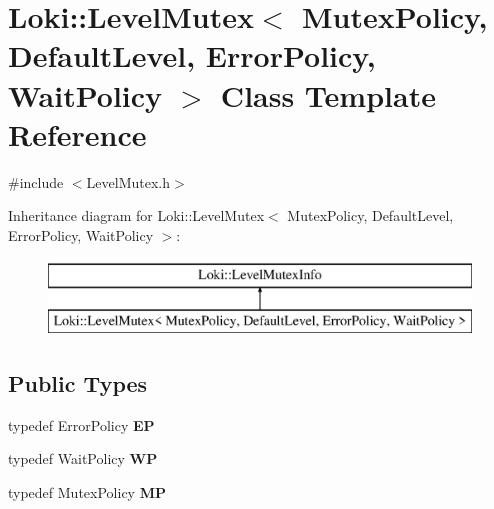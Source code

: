 \hypertarget{classLoki_1_1LevelMutex}{}\section{Loki\+:\+:Level\+Mutex$<$ Mutex\+Policy, Default\+Level, Error\+Policy, Wait\+Policy $>$ Class Template Reference}
\label{classLoki_1_1LevelMutex}


{\ttfamily \#include $<$Level\+Mutex.\+h$>$}

Inheritance diagram for Loki\+:\+:Level\+Mutex$<$ Mutex\+Policy, Default\+Level, Error\+Policy, Wait\+Policy $>$\+:\begin{figure}[H]
\begin{center}
\leavevmode
\includegraphics[height=2.000000cm]{classLoki_1_1LevelMutex}
\end{center}
\end{figure}
\subsection*{Public Types}
\begin{DoxyCompactItemize}
\item 
\hypertarget{classLoki_1_1LevelMutex_a4fdd142b6c6bd6a41d40d0b36e3973fa}{}typedef Error\+Policy {\bfseries E\+P}\label{classLoki_1_1LevelMutex_a4fdd142b6c6bd6a41d40d0b36e3973fa}

\item 
\hypertarget{classLoki_1_1LevelMutex_a57927b792966b9fb3559cfd9c9a0d427}{}typedef Wait\+Policy {\bfseries W\+P}\label{classLoki_1_1LevelMutex_a57927b792966b9fb3559cfd9c9a0d427}

\item 
\hypertarget{classLoki_1_1LevelMutex_aac7b7c64c9257dbf9bb22ab2bfb4b574}{}typedef Mutex\+Policy {\bfseries M\+P}\label{classLoki_1_1LevelMutex_aac7b7c64c9257dbf9bb22ab2bfb4b574}

\end{DoxyCompactItemize}
